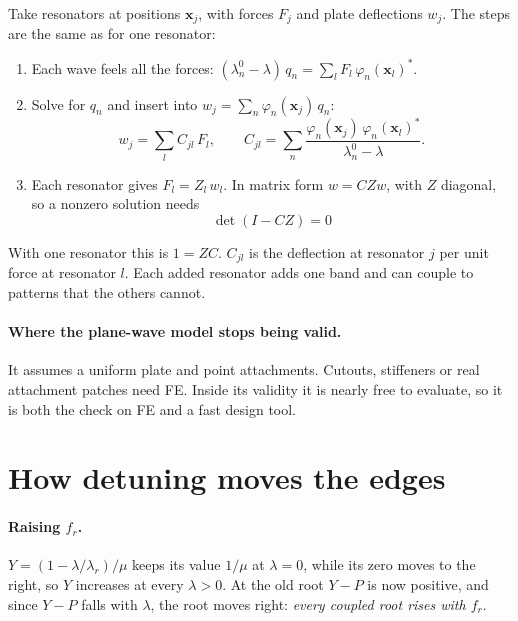 Take resonators at positions $\mathbf{x}_j$, with forces $F_j$ and plate
deflections $w_j$. The steps are the same as for one resonator:
\begin{enumerate}
  \item Each wave feels all the forces:
        $(\lambda_n^0 - \lambda)\, q_n = \sum_l F_l\,\varphi_n(\mathbf{x}_l)^*$.
  \item Solve for $q_n$ and insert into
        $w_j = \sum_n \varphi_n(\mathbf{x}_j)\, q_n$:
        \begin{equation}
          w_j = \sum_l C_{jl}\, F_l ,
          \qquad
          C_{jl} = \sum_n \frac{\varphi_n(\mathbf{x}_j)\,\varphi_n(\mathbf{x}_l)^*}{\lambda_n^0 - \lambda} .
        \end{equation}
  \item Each resonator gives $F_l = Z_l\, w_l$. In matrix form $w = C Z w$, with
        $Z$ diagonal, so a nonzero solution needs
        \begin{equation}
          \boxed{\;\det(I - C Z) = 0\;}
        \end{equation}
\end{enumerate}
With one resonator this is $1 = ZC$. $C_{jl}$ is the deflection at resonator $j$
per unit force at resonator $l$. Each added resonator adds one band and can
couple to patterns that the others cannot.

\paragraph{Where the plane-wave model stops being valid.}
It assumes a uniform plate and point attachments. Cutouts, stiffeners or real
attachment patches need FE. Inside its validity it is nearly free to evaluate, so
it is both the check on FE and a fast design tool.

\section{How detuning moves the edges}

\paragraph{Raising $f_r$.}
$Y = (1 - \lambda/\lambda_r)/\mu$ keeps its value $1/\mu$ at $\lambda = 0$, while
its zero moves to the right, so $Y$ increases at every $\lambda > 0$. At the old
root $Y - P$ is now positive, and since $Y - P$ falls with $\lambda$, the root
moves right: \emph{every coupled root rises with $f_r$}.

